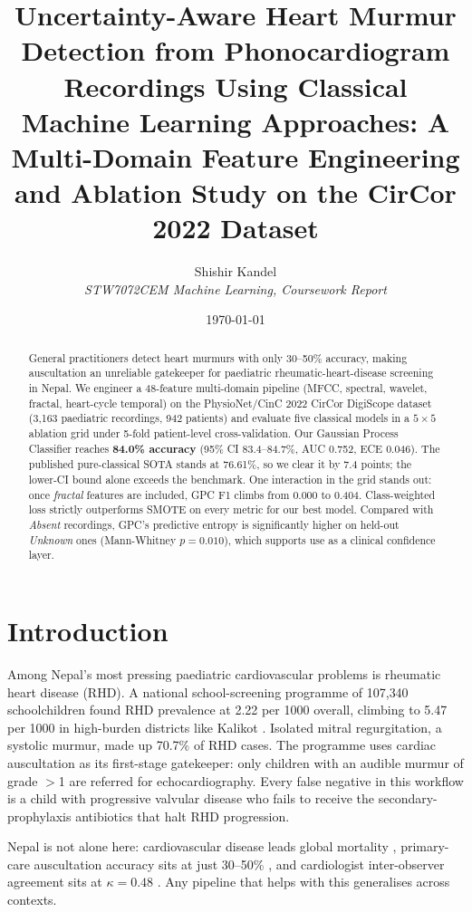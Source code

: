 \documentclass[10pt,twocolumn]{article}
\title{\textbf{Uncertainty-Aware Heart Murmur Detection from Phonocardiogram Recordings Using Classical Machine Learning Approaches: A Multi-Domain Feature Engineering and Ablation Study on the CirCor 2022 Dataset}}
\author{Shishir Kandel \\
\textit{STW7072CEM Machine Learning, Coursework Report}}
\date{\today}
\begin{document}
\maketitle

\begin{abstract}
General practitioners detect heart murmurs with only 30--50\% accuracy, making auscultation an unreliable gatekeeper for paediatric rheumatic-heart-disease screening in Nepal. We engineer a 48-feature multi-domain pipeline (MFCC, spectral, wavelet, fractal, heart-cycle temporal) on the PhysioNet/CinC 2022 CirCor DigiScope dataset (3{,}163 paediatric recordings, 942 patients) and evaluate five classical models in a $5 \times 5$ ablation grid under 5-fold patient-level cross-validation. Our Gaussian Process Classifier reaches \textbf{84.0\% accuracy} (95\% CI 83.4--84.7\%, AUC 0.752, ECE 0.046). The published pure-classical SOTA stands at 76.61\%, so we clear it by 7.4 points; the lower-CI bound alone exceeds the benchmark. One interaction in the grid stands out: once \textit{fractal} features are included, GPC F1 climbs from 0.000 to 0.404. Class-weighted loss strictly outperforms SMOTE on every metric for our best model. Compared with \textit{Absent} recordings, GPC's predictive entropy is significantly higher on held-out \textit{Unknown} ones (Mann-Whitney $p = 0.010$), which supports use as a clinical confidence layer.
\end{abstract}

\section{Introduction}

Among Nepal's most pressing paediatric cardiovascular problems is rheumatic heart disease (RHD). A national school-screening programme of 107{,}340 schoolchildren found RHD prevalence at 2.22 per 1000 overall, climbing to 5.47 per 1000 in high-burden districts like Kalikot \citep{nepal_rhd2023}. Isolated mitral regurgitation, a systolic murmur, made up 70.7\% of RHD cases. The programme uses cardiac auscultation as its first-stage gatekeeper: only children with an audible murmur of grade $>$1 are referred for echocardiography. Every false negative in this workflow is a child with progressive valvular disease who fails to receive the secondary-prophylaxis antibiotics that halt RHD progression.

Nepal is not alone here: cardiovascular disease leads global mortality \citep{who2021}, primary-care auscultation accuracy sits at just 30--50\% \citep{lam2015}, and cardiologist inter-observer agreement sits at $\kappa = 0.48$ \citep{dahl2022}. Any pipeline that helps with this generalises across contexts.
\end{document}
